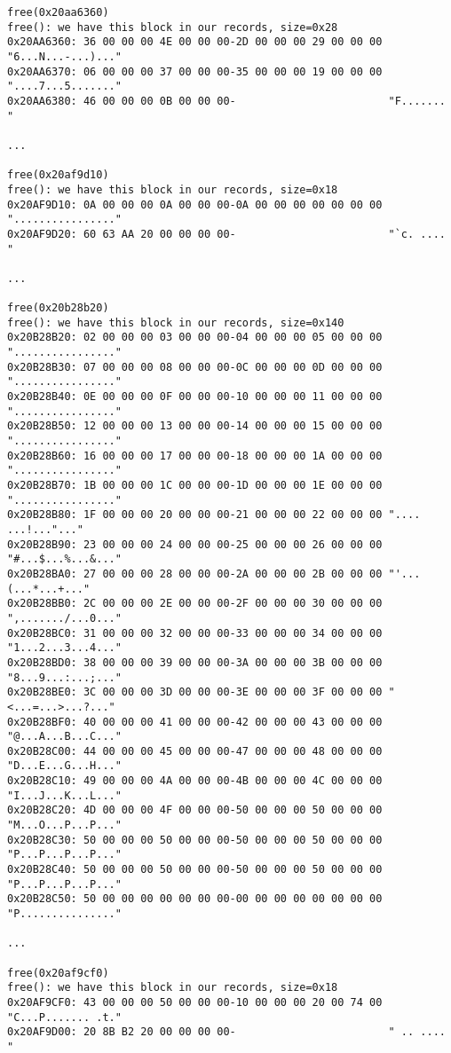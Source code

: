 \begin{lstlisting}
free(0x20aa6360)
free(): we have this block in our records, size=0x28
0x20AA6360: 36 00 00 00 4E 00 00 00-2D 00 00 00 29 00 00 00 "6...N...-...)..."
0x20AA6370: 06 00 00 00 37 00 00 00-35 00 00 00 19 00 00 00 "....7...5......."
0x20AA6380: 46 00 00 00 0B 00 00 00-                        "F.......        "

...

free(0x20af9d10)
free(): we have this block in our records, size=0x18
0x20AF9D10: 0A 00 00 00 0A 00 00 00-0A 00 00 00 00 00 00 00 "................"
0x20AF9D20: 60 63 AA 20 00 00 00 00-                        "`c. ....        "

...

free(0x20b28b20)
free(): we have this block in our records, size=0x140
0x20B28B20: 02 00 00 00 03 00 00 00-04 00 00 00 05 00 00 00 "................"
0x20B28B30: 07 00 00 00 08 00 00 00-0C 00 00 00 0D 00 00 00 "................"
0x20B28B40: 0E 00 00 00 0F 00 00 00-10 00 00 00 11 00 00 00 "................"
0x20B28B50: 12 00 00 00 13 00 00 00-14 00 00 00 15 00 00 00 "................"
0x20B28B60: 16 00 00 00 17 00 00 00-18 00 00 00 1A 00 00 00 "................"
0x20B28B70: 1B 00 00 00 1C 00 00 00-1D 00 00 00 1E 00 00 00 "................"
0x20B28B80: 1F 00 00 00 20 00 00 00-21 00 00 00 22 00 00 00 ".... ...!..."..."
0x20B28B90: 23 00 00 00 24 00 00 00-25 00 00 00 26 00 00 00 "#...$...%...&..."
0x20B28BA0: 27 00 00 00 28 00 00 00-2A 00 00 00 2B 00 00 00 "'...(...*...+..."
0x20B28BB0: 2C 00 00 00 2E 00 00 00-2F 00 00 00 30 00 00 00 ",......./...0..."
0x20B28BC0: 31 00 00 00 32 00 00 00-33 00 00 00 34 00 00 00 "1...2...3...4..."
0x20B28BD0: 38 00 00 00 39 00 00 00-3A 00 00 00 3B 00 00 00 "8...9...:...;..."
0x20B28BE0: 3C 00 00 00 3D 00 00 00-3E 00 00 00 3F 00 00 00 "<...=...>...?..."
0x20B28BF0: 40 00 00 00 41 00 00 00-42 00 00 00 43 00 00 00 "@...A...B...C..."
0x20B28C00: 44 00 00 00 45 00 00 00-47 00 00 00 48 00 00 00 "D...E...G...H..."
0x20B28C10: 49 00 00 00 4A 00 00 00-4B 00 00 00 4C 00 00 00 "I...J...K...L..."
0x20B28C20: 4D 00 00 00 4F 00 00 00-50 00 00 00 50 00 00 00 "M...O...P...P..."
0x20B28C30: 50 00 00 00 50 00 00 00-50 00 00 00 50 00 00 00 "P...P...P...P..."
0x20B28C40: 50 00 00 00 50 00 00 00-50 00 00 00 50 00 00 00 "P...P...P...P..."
0x20B28C50: 50 00 00 00 00 00 00 00-00 00 00 00 00 00 00 00 "P..............."

...

free(0x20af9cf0)
free(): we have this block in our records, size=0x18
0x20AF9CF0: 43 00 00 00 50 00 00 00-10 00 00 00 20 00 74 00 "C...P....... .t."
0x20AF9D00: 20 8B B2 20 00 00 00 00-                        " .. ....        "
\end{lstlisting}

